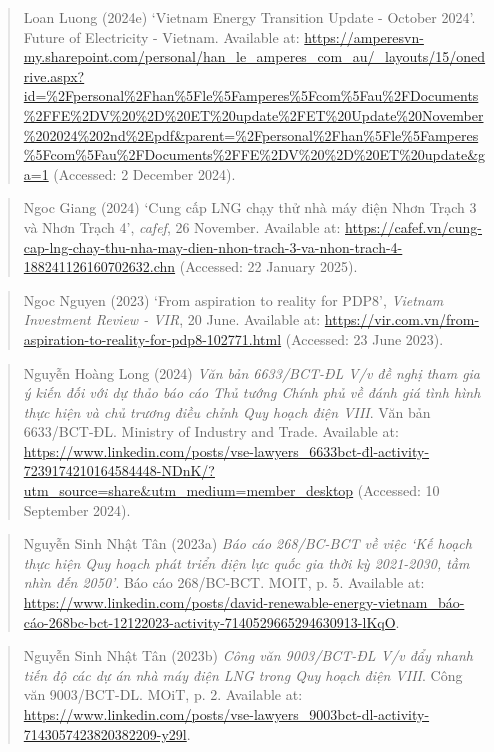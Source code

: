 \documentclass[a4paper,11pt]{report}
\begin{document}
\begin{quote}
Loan Luong (2024e) `Vietnam Energy Transition Update - October 2024'. Future of Electricity - Vietnam. Available at: \url{https://amperesvn-my.sharepoint.com/personal/han_le_amperes_com_au/_layouts/15/onedrive.aspx?id=\%2Fpersonal\%2Fhan\%5Fle\%5Famperes\%5Fcom\%5Fau\%2FDocuments\%2FFE\%2DV\%20\%2D\%20ET\%20update\%2FET\%20Update\%20November\%202024\%202nd\%2Epdf\&parent=\%2Fpersonal\%2Fhan\%5Fle\%5Famperes\%5Fcom\%5Fau\%2FDocuments\%2FFE\%2DV\%20\%2D\%20ET\%20update\&ga=1} (Accessed: 2 December 2024).
\end{quote}

\begin{quote}
Ngoc Giang (2024) `Cung cấp LNG chạy thử nhà máy điện Nhơn Trạch 3 và Nhơn Trạch 4', \emph{cafef}, 26 November. Available at: \url{https://cafef.vn/cung-cap-lng-chay-thu-nha-may-dien-nhon-trach-3-va-nhon-trach-4-188241126160702632.chn} (Accessed: 22 January 2025).
\end{quote}

\begin{quote}
Ngoc Nguyen (2023) `From aspiration to reality for PDP8', \emph{Vietnam Investment Review - VIR}, 20 June. Available at: \url{https://vir.com.vn/from-aspiration-to-reality-for-pdp8-102771.html} (Accessed: 23 June 2023).
\end{quote}

\begin{quote}
Nguyễn Hoàng Long (2024) \emph{Văn bản 6633/BCT-ĐL V/v đề nghị tham gia ý kiến đối với dự thảo báo cáo Thủ tướng Chính phủ về đánh giá tình hình thực hiện và chủ trương điều chỉnh Quy hoạch điện VIII}. Văn bản 6633/BCT-ĐL. Ministry of Industry and Trade. Available at: \url{https://www.linkedin.com/posts/vse-lawyers_6633bct-đl-activity-7239174210164584448-NDnK/?utm_source=share\&utm_medium=member_desktop} (Accessed: 10 September 2024).
\end{quote}

\begin{quote}
Nguyễn Sinh Nhật Tân (2023a) \emph{Báo cáo 268/BC-BCT về việc `Kế hoạch thực hiện Quy hoạch phát triển điện lực quốc gia thời kỳ 2021-2030, tầm nhìn đến 2050'}. Báo cáo 268/BC-BCT. MOIT, p. 5. Available at: \url{https://www.linkedin.com/posts/david-renewable-energy-vietnam_báo-cáo-268bc-bct-12122023-activity-7140529665294630913-lKqO}.
\end{quote}

\begin{quote}
Nguyễn Sinh Nhật Tân (2023b) \emph{Công văn 9003/BCT-ĐL V/v đẩy nhanh tiến độ các dự án nhà máy điện LNG trong Quy hoạch điện VIII}. Công văn 9003/BCT-DL. MOiT, p. 2. Available at: \url{https://www.linkedin.com/posts/vse-lawyers_9003bct-dl-activity-7143057423820382209-y29l}.
\end{quote}
\end{document}
